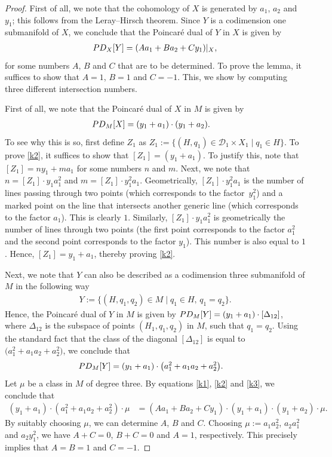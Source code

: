 \documentclass[11pt]{article}
\numberwithin{equation}{section}
\begin{document}
\begin{proof} First of all, we note that the cohomology of $X$
is generated by $a_1$, $a_2$ and $y_1$; this follows from the Leray--Hirsch theorem.
Since $Y$ is a codimension one submanifold of $X$, we conclude that the
Poincar\'{e} dual of $Y$ in $X$ is given by
\begin{align}
\textnormal{PD}_{X}[Y] = (A a_1 + B a_2 + C y_1)|_{X}, \label{k1}
\end{align}
for some numbers $A$, $B$ and $C$ that are to be determined.
To prove the lemma, it suffices to show that $A = 1$, $ B = 1$ and $C = -1$.
This, we show by computing three different intersection numbers.

First of all, we note that the Poincar\'{e} dual of $X$ in $M$ is given by
\begin{align}
\textnormal{PD}_{M}[X]& = (y_1+a_1)\cdot(y_1+a_2). \label{k2}
\end{align}
To see why this is so, first define $Z_1$ as
$
Z_1 := \{ (H, q_1) \in \mathcal{D}_1 \times X_1  \mid  q_1 \in H\}$.
To prove \eqref{k2}, it suffices to show that $[Z_1] = (y_1 + a_1)$.
To justify this, note that
$[Z_1] = n y_1 + m a_1$ for some numbers $n$ and $m$. Next, we note that
$n = [Z_1]\cdot y_1 a_1^2$ and $m = [Z_1]\cdot y_1^2 a_1$.
Geometrically, $[Z_1]\cdot y_1^2 a_1$ is the number of lines passing through
two points \big(which corresponds to the factor~$y_1^2$\big) and a marked point on the line
that intersects another generic line (which corresponds to the factor $a_1$). This is
clearly $1$. Similarly, $[Z_1]\cdot y_1 a_1^2$ is geometrically the number of lines
through two points (the first point corresponds to the factor $a_1^2$ and the second point
corresponds to the factor $y_1$). This number is also equal to $1$. Hence,
$[Z_1]= y_1 + a_1$, thereby proving \eqref{k2}.

Next, we note that $Y$ can also be described as a codimension three submanifold of $M$
in the following way
\begin{align*}
Y:= \{ (H, q_1, q_2) \in M\mid q_1 \in H,\,  q_1 = q_2\}.
\end{align*}
Hence, the Poincar\'{e} dual of $Y$ in $M$ is given by
$
\textnormal{PD}_{M}[Y] = (y_1+a_1)\cdot [\Delta_{12}]$,
where $\Delta_{12}$ is the subspace of points $(H_1, q_1, q_2)$ in $M$, such that
$q_1 = q_2$.
Using the standard fact that the class of the diagonal
$[\Delta_{12}]$ is equal to $\big(a_1^2 + a_1 a_2 + a_2^2\big)$,
we conclude that
\begin{align}
\textnormal{PD}_{M}[Y]& = (y_1+a_1)\cdot \big(a_1^2 + a_1 a_2 + a_2^2\big). \label{k3}
\end{align}
Let $\mu$ be a class in $M$ of degree three. By equations \eqref{k1}, \eqref{k2} and \eqref{k3},
we conclude that
\begin{align*}
(y_1+a_1)\cdot (a_1^2 + a_1 a_2 + a_2^2) \cdot \mu & = (A a_1 + B a_2 + C y_1)\cdot (y_1+a_1)\cdot(y_1+a_2) \cdot \mu.
\end{align*}
By suitably choosing $\mu$, we can determine $A$, $B$ and $C$.
Choosing $\mu := a_1 a_2^2$, $a_2a_1^2$ and $a_2 y_1^2$, we have
$A+C = 0$, $B+C = 0$ and $A = 1$, respectively. This precisely implies that
$A = B = 1$ and $C = -1$.
\end{proof}
\end{document}
